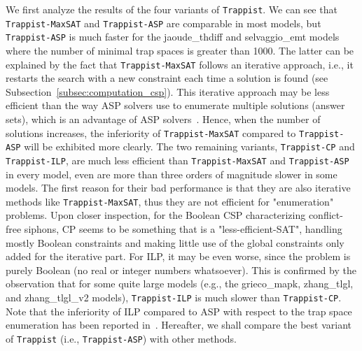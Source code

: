 \documentclass[preprint,12pt]{elsarticle}
\begin{document}
We first analyze the results of the four variants of \texttt{Trappist}.
We can see that \texttt{Trappist-MaxSAT} and \texttt{Trappist-ASP} are comparable in most models, but \texttt{Trappist-ASP} is much faster for the jaoude\_thdiff and selvaggio\_emt models where the number of minimal trap spaces is greater than 1000.
The latter can be explained by the fact that \texttt{Trappist-MaxSAT} follows an iterative approach, i.e., it restarts the search with a new constraint each time a solution is found (see Subsection~\ref{subsec:computation_csp}).
This iterative approach may be less efficient than the way ASP solvers use to enumerate multiple solutions (answer sets), which is an advantage of ASP solvers~\cite{DBLP:journals/aicom/GebserKKOSS11}.
Hence, when the number of solutions increases, the inferiority of \texttt{Trappist-MaxSAT} compared to \texttt{Trappist-ASP} will be exhibited more clearly.
The two remaining variants, \texttt{Trappist-CP} and \texttt{Trappist-ILP}, are much less efficient than \texttt{Trappist-MaxSAT} and \texttt{Trappist-ASP} in every model, even are more than three orders of magnitude slower in some models.
The first reason for their bad performance is that they are also iterative methods like \texttt{Trappist-MaxSAT}, thus they are not efficient for "enumeration" problems.
Upon closer inspection, for the Boolean CSP characterizing conflict-free siphons, CP seems to be something that is a "less-efficient-SAT", handling mostly Boolean constraints and making little use of the global constraints only added for the iterative part.
For ILP, it may be even worse, since the problem is purely Boolean (no
real or integer numbers whatsoever).
This is confirmed by the observation that for some quite large models (e.g., the grieco\_mapk, zhang\_tlgl, and zhang\_tlgl\_v2 models), \texttt{Trappist-ILP} is much slower than \texttt{Trappist-CP}.
Note that the inferiority of ILP compared to ASP with respect to the trap space enumeration has been reported in~\cite{klarner2015computing}.
Hereafter, we shall compare the best variant of \texttt{Trappist} (i.e., \texttt{Trappist-ASP}) with other methods.
 
\end{document}
